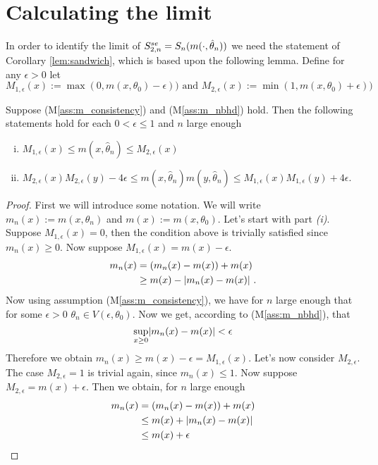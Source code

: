 \section{Calculating the limit} \label{sec:limit}

In order to identify the limit of $S_{2,n}^{se} = S_n(m(\cdot, \hat\theta_n))$ we need the statement of Corollary \ref{lem:sandwich}, which is based upon the following lemma. Define for any $\epsilon >0$ let
$$M_{1,\epsilon}(x) := \max(0, m(x, \theta_0) - \epsilon)) \textrm{ and } M_{2,\epsilon}(x) := \min(1, m(x, \theta_0) + \epsilon))$$
\begin{lemma} 
	Suppose (M\ref{ass:m_consistency}) and (M\ref{ass:m_nbhd}) hold. Then the following statements hold for each $0 < \epsilon \leq 1$ and $n$ large enough
	\begin{enumerate}[(i)]
		\item $M_{1,\epsilon}(x) \leq m(x,\hat\theta_n) \leq M_{2,\epsilon}(x)$
		\item $M_{2,\epsilon}(x)M_{2,\epsilon}(y) - 4\epsilon \leq m(x,\hat\theta_n)m(y,\hat\theta_n) \leq M_{1,\epsilon}(x)M_{1,\epsilon}(y) + 4\epsilon$.
	\end{enumerate}
	\label{lem:Mm}
	\begin{proof}
		First we will introduce some notation. We will write $m_n(x) := m(x,\theta_n)$ and $m(x):= m(x,\theta_0)$. Let's start with part \textit{(i)}. Suppose $M_{1,\epsilon}(x) = 0$, then the condition above is trivially satisfied since $m_n(x) \geq 0$. Now suppose $M_{1,\epsilon}(x) = m(x)-\epsilon$. 
		\begin{align*}
			m_n(x) &= (m_n(x) - m(x)) + m(x)\\
			&\geq m(x) - \lvert m_n(x) - m(x)\rvert \textrm{ .}
		\end{align*}
		Now using assumption (M\ref{ass:m_consistency}), we have for $n$ large enough that for some $\epsilon > 0$ $\theta_n \in V(\epsilon, \theta_0)$. Now we get, according to (M\ref{ass:m_nbhd}), that 
		$$\sup_{x\geq 0}\lvert m_n(x) - m(x)\rvert < \epsilon$$
		Therefore we obtain $m_n(x) \geq m(x) - \epsilon= M_{1,\epsilon}(x)$. Let's now consider $M_{2,\epsilon}$. The case $M_{2,\epsilon} = 1$ is trivial again, since $m_n(x) \leq 1$. Now suppose $M_{2,\epsilon} = m(x) + \epsilon$. Then we obtain, for $n$ large enough
		\begin{align*}
			m_n(x) &= (m_n(x) - m(x)) + m(x)\\
			&\leq m(x) + \abs{m_n(x) - m(x)}\\
			&\leq m(x) + \epsilon\\

\end{align*}
\end{proof}
\end{lemma}
